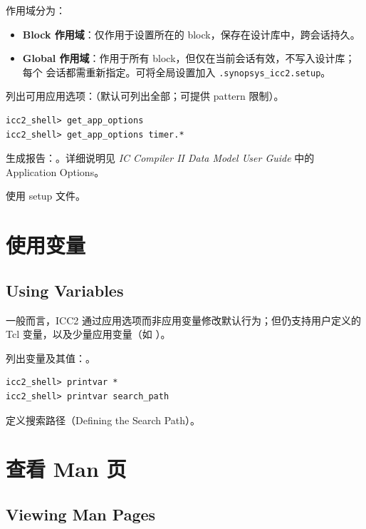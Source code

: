 作用域分为：
\begin{itemize}
  \item \textbf{Block 作用域}：仅作用于设置所在的 block，保存在设计库中，跨会话持久。
  \item \textbf{Global 作用域}：作用于所有 block，但仅在当前会话有效，不写入设计库；每个  会话都需重新指定。可将全局设置加入 \texttt{.synopsys\_icc2.setup}。
\end{itemize}

列出可用应用选项：（默认可列出全部；可提供 pattern 限制）。
\begin{lstlisting}
icc2_shell> get_app_options
icc2_shell> get_app_options timer.*
\end{lstlisting}

生成报告：。详细说明见 \textit{IC Compiler II Data Model User Guide} 中的 Application Options。

\begin{seeAlsoBox}
使用 setup 文件。
\end{seeAlsoBox}

\section{使用变量}
\subsection*{Using Variables}

一般而言，ICC2 通过应用选项而非应用变量修改默认行为；但仍支持用户定义的 Tcl 变量，以及少量应用变量（如 ）。

列出变量及其值：。
\begin{lstlisting}
icc2_shell> printvar *
icc2_shell> printvar search_path
\end{lstlisting}

\begin{seeAlsoBox}
定义搜索路径（Defining the Search Path）。
\end{seeAlsoBox}

\section{查看 Man 页}
\subsection*{Viewing Man Pages}

